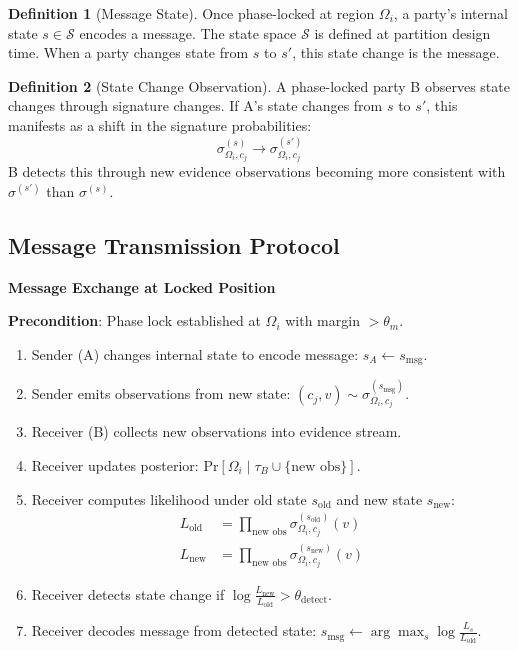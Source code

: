 \documentclass[11pt,a4paper]{article}
\theoremstyle{definition}
\newtheorem{definition}{Definition}[section]
\newcommand{\pr}[1]{\mathrm{Pr}\left[#1\right]}
\newcommand{\given}{\mid}
\begin{document}
\begin{definition}[Message State]
Once phase-locked at region $\Omega_i$, a party's internal state $s \in \mathcal{S}$ encodes a message. The state space $\mathcal{S}$ is defined at partition design time. When a party changes state from $s$ to $s'$, this state change is the message.
\end{definition}

\begin{definition}[State Change Observation]
A phase-locked party B observes state changes through signature changes. If A's state changes from $s$ to $s'$, this manifests as a shift in the signature probabilities:
\[
\sigma_{\Omega_i, c_j}^{(s)} \to \sigma_{\Omega_i, c_j}^{(s')}
\]
B detects this through new evidence observations becoming more consistent with $\sigma^{(s')}$ than $\sigma^{(s)}$.
\end{definition}

\subsection{Message Transmission Protocol}

\begin{algorithm}
\textbf{Message Exchange at Locked Position}

\textbf{Precondition}: Phase lock established at $\Omega_i$ with margin $> \theta_m$.

\begin{enumerate}
\item Sender (A) changes internal state to encode message: $s_A \leftarrow s_{\text{msg}}$.
\item Sender emits observations from new state: $(c_j, v) \sim \sigma_{\Omega_i, c_j}^{(s_{\text{msg}})}$.
\item Receiver (B) collects new observations into evidence stream.
\item Receiver updates posterior: $\pr{\Omega_i \given \tau_B \cup \{\text{new obs}\}}$.
\item Receiver computes likelihood under old state $s_{\text{old}}$ and new state $s_{\text{new}}$:
  \begin{align}
  L_{\text{old}} &= \prod_{\text{new obs}} \sigma_{\Omega_i, c_j}^{(s_{\text{old}})}(v) \\
  L_{\text{new}} &= \prod_{\text{new obs}} \sigma_{\Omega_i, c_j}^{(s_{\text{new}})}(v)
  \end{align}
\item Receiver detects state change if $\log \frac{L_{\text{new}}}{L_{\text{old}}} > \theta_{\text{detect}}$.
\item Receiver decodes message from detected state: $s_{\text{msg}} \leftarrow \arg\max_s \log \frac{L_s}{L_{\text{old}}}$.
\end{enumerate}
\end{algorithm}
\end{document}
